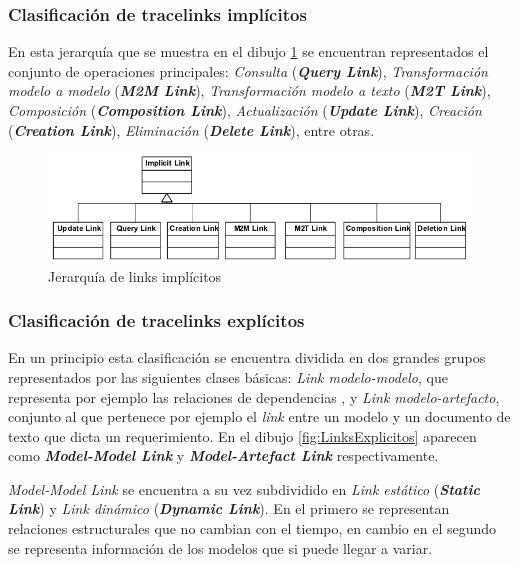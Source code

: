 \documentclass[a4paper,12pt,oneside,spanish]{book}
\begin{document}
\subsubsection{Clasificación de tracelinks implícitos}


En esta jerarquía que se muestra en el dibujo \ref{fig:LinksImplicitos} se encuentran representados el conjunto de operaciones  principales: \textit{Consulta} (\textit{\textbf{Query Link}}), \textit{Transformación modelo a modelo} (\textit{\textbf{M2M Link}}), \textit{Transformación modelo a texto} (\textit{\textbf{M2T Link}}), \textit{Composición} (\textit{\textbf{Composition Link}}), \textit{Actualización} (\textit{\textbf{Update Link}}), \textit{Creación} (\textit{\textbf{Creation Link}}), \textit{Eliminación} (\textit{\textbf{Delete Link}}), entre otras.


\begin{figure}[hbtp]
\centering
\includegraphics[scale=0.55]{./img/ImplicitTraceLinks}
\caption{Jerarquía de links implícitos}
\label{fig:LinksImplicitos}
\end{figure}


\subsubsection{Clasificación de tracelinks explícitos}

En un principio esta clasificación se encuentra dividida en dos grandes grupos representados por las siguientes clases básicas: \textit{Link modelo-modelo}, que representa por ejemplo las relaciones de dependencias , y \textit{Link modelo-artefacto}, conjunto al que pertenece por ejemplo el \textit{link} entre un modelo y un documento de texto que dicta un requerimiento. En el dibujo \ref{fig:LinksExplicitos} aparecen como \textit{\textbf{Model-Model Link}} y \textit{\textbf{Model-Artefact Link}} respectivamente.

\textit{Model-Model Link} se encuentra a su vez subdividido en \textit{Link estático} (\textit{\textbf{Static Link}}) y \textit{Link dinámico} (\textit{\textbf{Dynamic Link}}). En el primero se representan relaciones estructurales que no cambian con el tiempo, en cambio en el segundo se representa información de los modelos que si puede llegar a variar.
\end{document}
